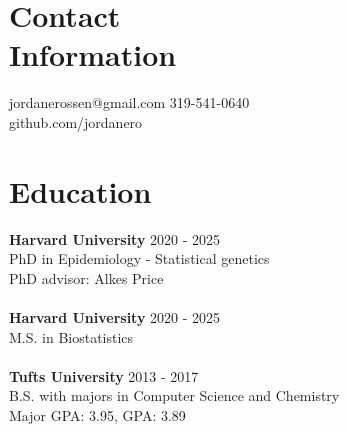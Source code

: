\documentclass[margin,line]{res}
\begin{document}

\begin{resume}
\section{Contact\\ Information}
jordanerossen@gmail.com             \hfill 319-541-0640 \\
github.com/jordanero
\section{Education}
{\bf Harvard University}  \hfill 2020 - 2025 \\
PhD in Epidemiology - Statistical genetics\\
PhD advisor: Alkes Price\\\\
{\bf Harvard University}  \hfill 2020 - 2025 \\
M.S. in Biostatistics \\\\
{\bf Tufts University}  \hfill 2013 - 2017 \\
B.S. with majors in Computer Science and Chemistry\\
Major GPA: 3.95, GPA: 3.89\\

\end{resume}
\end{document}
